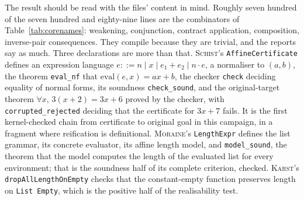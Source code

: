 \documentclass[11pt,a4paper]{article}
\newcommand{\code}[1]{\nolinkurl{#1}}
\newcommand{\Ks}{\textsc{Karst}}
\newcommand{\Mr}{\textsc{Moraine}}
\newcommand{\Sc}{\textsc{Schist}}
\theoremstyle{definition}
\begin{document}
The result should be read with the files' content in mind. Roughly seven hundred of the seven hundred and eighty-nine lines are the combinators of Table~\ref{tab:corenames}: weakening, conjunction, contract application, composition, inverse-pair consequences. They compile because they are trivial, and the reports say as much. Three declarations are more than that. \Sc's \code{AffineCertificate} defines an expression language $e::=n\mid x\mid e_1+e_2\mid n\cdot e$, a normaliser to $(a,b)$, the theorem \code{eval_nf} that $\mathrm{eval}(e,x)=ax+b$, the checker \code{check} deciding equality of normal forms, its soundness \code{check_sound}, and the original-target theorem $\forall x,\,3(x+2)=3x+6$ proved by the checker, with \code{corrupted_rejected} deciding that the certificate for $3x+7$ fails. It is the first kernel-checked chain from certificate to original goal in this campaign, in a fragment where reification is definitional. \Mr's \code{LengthExpr} defines the list grammar, its concrete evaluator, its affine length model, and \code{model_sound}, the theorem that the model computes the length of the evaluated list for every environment; that is the soundness half of its complete criterion, checked. \Ks's \code{dropAllLengthOnEmpty} checks that the constant-empty function preserves length on \code{List Empty}, which is the positive half of the realisability test.
\end{document}
